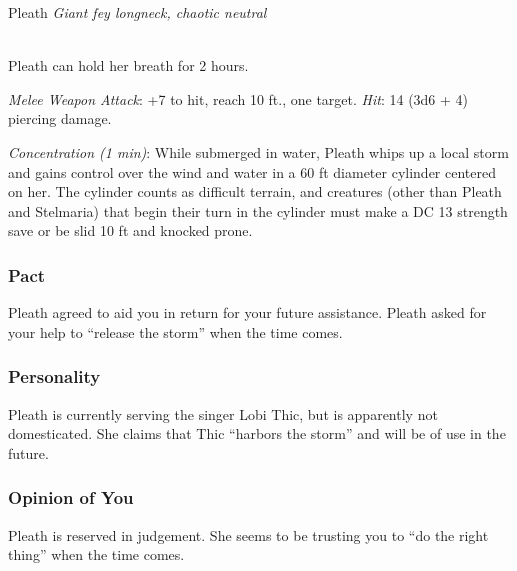 \documentclass[letterpaper,10pt,twoside,twocolumn,openany]{book}
\begin{document}
\begin{monsterbox}{ Pleath}
	\textit{Giant fey longneck, chaotic neutral}\\
	\hline%
	\basics[%
	armorclass = 13 (natural armor),
	hitpoints  = \dice{8d10 + 24},
	speed      = {10 ft., swim 40 ft.}
	]
	\hline%
	\stats[
    STR = \stat{18}, %
    DEX = \stat{15},
    CON = \stat{16},
    INT = \stat{9},
    WIS = \stat{12},
    CHA = \stat{5}
	]
	\hline%
	\details[%
	skills = {Perception + 3, Stealth +5 (when underwater)},
	senses = {pp 13},
	languages = {Longneck, understands Common and Sylvan but cannot speak},
	challenge = 2
	]
	\hline \\[1mm]
	\begin{monsteraction}
		Pleath can hold her breath for 2 hours.
	\end{monsteraction}
	
	\begin{monsteraction}[Bite]
		\emph{Melee Weapon Attack}: +7 to hit, reach 10 ft., one target. \emph{Hit}: 14 (3d6 + 4) piercing damage.
	\end{monsteraction}
	
	\begin{monsteraction}
		\emph{Concentration (1 min)}: While submerged in water, Pleath whips up a local storm and gains control over the wind and water in a 60 ft diameter cylinder centered on her. The cylinder counts as difficult terrain, and creatures (other than Pleath and Stelmaria) that begin their turn in the cylinder must make a DC 13 strength save or be slid 10 ft and knocked prone.
	\end{monsteraction}

\end{monsterbox}

\subsubsection{Pact}
Pleath agreed to aid you in return for your future assistance.
Pleath asked for your help to ``release the storm'' when the time comes. 

\subsubsection{Personality}
Pleath is currently serving the singer Lobi Thic, but is apparently not domesticated. 
She claims that Thic ``harbors the storm'' and will be of use in the future.

\subsubsection{Opinion of You}
Pleath is reserved in judgement. 
She seems to be trusting you to ``do the right thing'' when the time comes. 



\end{document}
